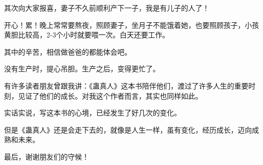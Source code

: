 \begin{this_body}
其次向大家报喜，妻子不久前顺利产下一子，我是有儿子的人了！

开心！累！晚上常常要熬夜，照顾妻子，坐月子不能饿着她，也要照顾孩子，小孩黄胆比较高，2-3个小时就要喂一次。白天还要工作。

其中的辛苦，相信做爸爸的都能体会吧。

没有生产时，提心吊胆。生产之后，变得更忙了。

有许多读者朋友曾跟我讲：《蛊真人》这本书陪伴他们，渡过了许多人生的重要时刻，见证了他们的成长。对我这个作者而言，其实也同样如此。

实话实说，写这本书的心境，已经发生了好几次的变化。

但是《蛊真人》还是会走下去的，就像是人生一样，虽有变化，经历成长，迈向成熟和未来。

最后，谢谢朋友们的守候！

\end{this_body}

